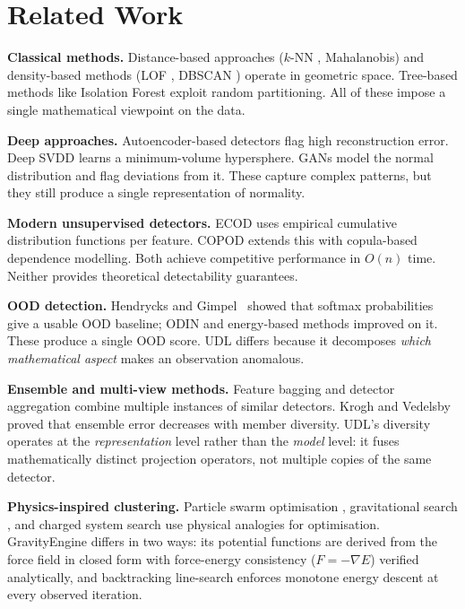 \documentclass{article}
\begin{document}
\section{Related Work}
\label{sec:related}

\textbf{Classical methods.} Distance-based approaches ($k$-NN \citep{ramaswamy2000efficient}, Mahalanobis) and density-based methods (LOF \citep{breunig2000lof}, DBSCAN \citep{ester1996density}) operate in geometric space. Tree-based methods like Isolation Forest \citep{liu2008isolation} exploit random partitioning. All of these impose a single mathematical viewpoint on the data.

\textbf{Deep approaches.} Autoencoder-based detectors \citep{an2015variational,zhou2017anomaly} flag high reconstruction error. Deep SVDD \citep{ruff2018deep} learns a minimum-volume hypersphere. GANs \citep{schlegl2017unsupervised} model the normal distribution and flag deviations from it. These capture complex patterns, but they still produce a single representation of normality.

\textbf{Modern unsupervised detectors.} ECOD \citep{li2022ecod} uses empirical cumulative distribution functions per feature. COPOD \citep{li2020copod} extends this with copula-based dependence modelling. Both achieve competitive performance in $O(n)$ time. Neither provides theoretical detectability guarantees.

\textbf{OOD detection.} Hendrycks and Gimpel~\citep{hendrycks2017baseline} showed that softmax probabilities give a usable OOD baseline; ODIN \citep{liang2018odin} and energy-based methods \citep{liu2020energy} improved on it. These produce a single OOD score. UDL differs because it decomposes \emph{which mathematical aspect} makes an observation anomalous.

\textbf{Ensemble and multi-view methods.} Feature bagging \citep{lazarevic2005feature} and detector aggregation \citep{aggarwal2015theoretical} combine multiple instances of similar detectors. Krogh and Vedelsby~\citep{krogh1995neural} proved that ensemble error decreases with member diversity. UDL's diversity operates at the \emph{representation} level rather than the \emph{model} level: it fuses mathematically distinct projection operators, not multiple copies of the same detector.

\textbf{Physics-inspired clustering.} Particle swarm optimisation \citep{kennedy1995particle}, gravitational search \citep{rashedi2009gsa}, and charged system search \citep{kaveh2010css} use physical analogies for optimisation. GravityEngine differs in two ways: its potential functions are derived from the force field in closed form with force-energy consistency ($F = -\nabla E$) verified analytically, and backtracking line-search enforces monotone energy descent at every observed iteration.
\end{document}
